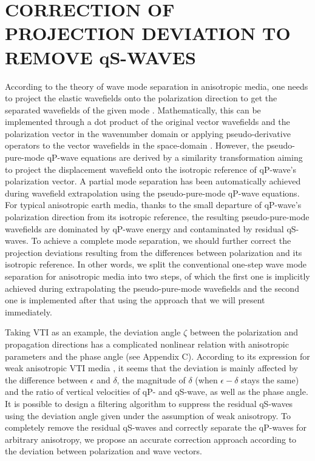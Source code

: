 \section{CORRECTION OF PROJECTION DEVIATION TO REMOVE qS-WAVES}

According to the theory of wave mode separation in anisotropic media,
 one needs to project the elastic wavefields onto the polarization 
direction to get the separated wavefields of the given mode \cite[]{dellinger.etgen:1990}.
Mathematically, this can be implemented through a dot product of the original vector wavefields
 and the polarization vector in the wavenumber domain  \cite[]{dellinger.etgen:1990}
or applying pseudo-derivative operators
 to the vector wavefields in the space-domain \cite[]{yan.sava:2009}. 
 However, the pseudo-pure-mode qP-wave equations are derived by a similarity transformation
aiming to project the displacement wavefield onto the isotropic reference of
 qP-wave's polarization vector. A partial mode separation
 has been automatically achieved during wavefield extrapolation using the pseudo-pure-mode qP-wave equations.
For typical anisotropic earth media, thanks to the small departure of qP-wave's polarization
	direction from its isotropic reference,
	the resulting pseudo-pure-mode wavefields are dominated by qP-wave energy and contaminated by residual qS-waves.
To achieve a complete mode separation, we should further correct the projection 
deviations resulting from the differences between polarization and its isotropic reference.
In other words, we split the conventional one-step wave mode separation for anisotropic media
\cite[]{dellinger.etgen:1990,yan.sava:2009} into two steps, of which the first one is implicitly achieved
during extrapolating the pseudo-pure-mode wavefields and the second one is implemented after that
using the approach that we will present immediately. 

 Taking VTI as an example, the deviation angle $\zeta$ between the polarization and 
propagation directions has a complicated nonlinear relation
 with anisotropic parameters and the phase angle (see Appendix C).
According to its expression for weak anisotropic VTI media
 \cite[]{rommel:1994,tsvankin:2001}, it seems that the deviation is mainly affected
 by the difference between $\epsilon$ and $\delta$,  the magnitude of $\delta$ (when 
$\epsilon-\delta$ stays the same) and the ratio of vertical velocities of qP- and qS-wave,
 as well as the phase angle.
It is possible to design a filtering algorithm 
to suppress the residual qS-waves using the deviation angle given under the assumption of weak anisotropy. 
To completely remove the residual qS-waves and correctly separate the qP-waves for arbitrary anisotropy, we 
propose an accurate correction approach according to the deviation between polarization and wave vectors.

